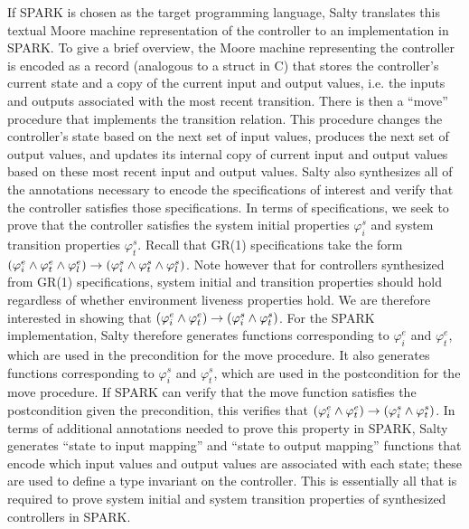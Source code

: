\documentclass[runningheads]{llncs}
\begin{document}
If SPARK is chosen as the target programming language, Salty translates this textual Moore machine representation 
of the controller to an implementation in SPARK. 
To give a brief overview, the Moore machine representing the controller is encoded as a record (analogous to a struct in C) 
that stores the controller's current state and a copy of the current input and output values, 
i.e. the inputs and outputs associated with the most recent transition. 
There is then a ``move'' procedure that implements the transition relation. 
This procedure changes the controller's state based on the next set of input values, produces the next set of output values, 
and updates its internal copy of current input and output values based on these most recent input and output values. 
Salty also synthesizes all of the annotations necessary to encode the specifications of interest 
and verify that the controller satisfies those specifications. 
In terms of specifications, we seek to prove that the controller satisfies the system initial properties $\varphi^s_i$ 
and system transition properties $\varphi^s_t$. 
Recall that GR(1) specifications take the form 
$(\varphi^e_i \land \varphi^e_t \land \varphi^e_l)  \rightarrow (\varphi^s_i \land \varphi^s_t \land \varphi^s_l)$. 
Note however that for controllers synthesized from GR(1) specifications,
system initial and transition properties should hold regardless of whether environment liveness properties hold. 
We are therefore interested in showing that 
$(\varphi^e_i \land \varphi^e_t)  \rightarrow (\varphi^s_i \land \varphi^s_t)$. 
For the SPARK implementation, Salty therefore generates functions corresponding to $\varphi^e_i$ and $\varphi^e_t$,
which are used in the precondition for the move procedure. 
It also generates functions corresponding to $\varphi^s_i$ and $\varphi^s_t$, 
which are used in the postcondition for the move procedure. 
If SPARK can verify that the move function satisfies the postcondition given the precondition, 
this verifies that $(\varphi^e_i \land \varphi^e_t)  \rightarrow (\varphi^s_i \land \varphi^s_t)$. 
In terms of additional annotations needed to prove this property in SPARK, Salty generates 
``state to input mapping'' and ``state to output mapping'' functions that encode which input values 
and output values are associated with each state; these are used to define a type invariant on the controller.  
This is essentially all that is required to prove system initial and system transition properties of synthesized controllers in SPARK.
\end{document}
